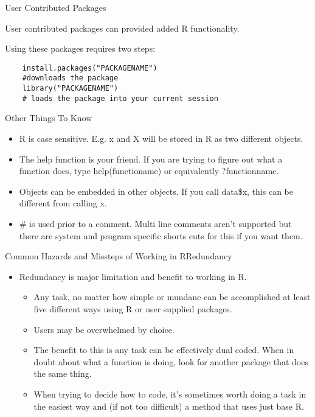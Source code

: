\documentclass{beamer}
\begin{document}
\begin{frame}[fragile]{User Contributed Packages}
\item User contributed packages can provided added R functionality.  
\item Using these packages requires two steps:
\begin{verbatim}
    install.packages("PACKAGENAME")
    #downloads the package
    library("PACKAGENAME") 
    # loads the package into your current session
\end{verbatim}
\end{frame}
\begin{frame}{Other Things To Know}
\begin{itemize}
    \item R is case sensitive. E.g. x and X will be stored in R as two different objects.
    \item The help function is your friend.  If you are trying to figure out what a function does, type help(functioname) or equivalently ?functionname.
    \item Objects can be embedded in other objects.  If you call data\$x, this can be different from calling x.
   \item \# is used prior to a comment.  Multi line comments aren't supported but there are system and program specific shorts cuts for this if you want them.
    \end{itemize}
    \end{frame}


\begin{frame}{Common Hazards and Missteps of Working in R}{Redundancy}
\begin{itemize}

    \item Redundancy is major limitation and benefit to working in R.
    \begin{itemize}
        \item Any task, no matter how simple or mundane can be accomplished at least five different ways using R or user supplied packages.
        \item Users may be overwhelmed by choice. 
        \item The benefit to this is any task can be effectively dual coded.  When in doubt about what a function is doing, look for another package that does the same thing.
        \item When trying to decide how to code, it's sometimes worth doing a task in the easiest way and (if not too difficult) a method that uses just base R.  
    \end{itemize}
\end{itemize}
\end{frame}
\end{document}
